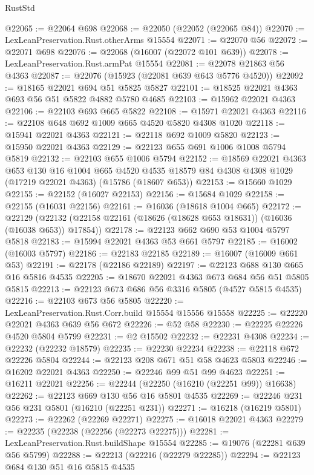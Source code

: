 \begin{lexlean}{RustStd}
\begin{coremodule}
@22065 := @22064 @698
@22068 := @22050 (@22052 (@22065 @84))
@22070 := LexLeanPreservation.Rust.otherArms @15554
@22071 := @22070 @56
@22072 := @22071 @698
@22076 := @22068 (@16007 (@22072 @101 @639))
@22078 := LexLeanPreservation.Rust.armPat @15554
@22081 := @22078 @21863 @56 @4363
@22087 := @22076 (@15923 (@22081 @639 @643 @5776 @4520))
@22092 := @18165 @22021 @694 @51 @5825 @5827
@22101 := @18525 @22021 @4363 @693 @56 @51 @5822 @4882 @5780 @4685
@22103 := @15962 @22021 @4363
@22106 := @22103 @693 @665 @5822
@22108 := @15971 @22021 @4363
@22116 := @22108 @648 @692 @1009 @665 @4520 @5820 @4308 @1020
@22118 := @15941 @22021 @4363
@22121 := @22118 @692 @1009 @5820
@22123 := @15950 @22021 @4363
@22129 := @22123 @655 @691 @1006 @1008 @5794 @5819
@22132 := @22103 @655 @1006 @5794
@22152 := @18569
    @22021
    @4363
    @653
    @130
    @16
    @1004
    @665
    @4520
    @4535
    @18579
    @84
    @4308
    @4308
    @1029
    (@17219 @22021 @4363)
    (@15786 (@18607 @653))
@22153 := @15660 @1029
@22155 := @22152 (@16027 @22153)
@22156 := @15684 @1029
@22158 := @22155 (@16031 @22156)
@22161 := @16036 (@18618 @1004 @665)
@22172 := @22129
    (@22132 (@22158 @22161 (@18626 (@18628 @653 @18631)) (@16036 (@16038 @653)) @17854))
@22178 := @22123 @662 @690 @53 @1004 @5797 @5818
@22183 := @15994 @22021 @4363 @53 @661 @5797
@22185 := @16002 (@16003 @5797)
@22186 := @22183 @22185
@22189 := @16007 (@16009 @661 @53)
@22191 := @22178 (@22186 @22189)
@22197 := @22123 @688 @130 @665 @16 @5816 @4535
@22205 := @18670 @22021 @4363 @673 @684 @56 @51 @5805 @5815
@22213 := @22123 @673 @686 @56 @3316 @5805 (@4527 @5815 @4535)
@22216 := @22103 @673 @56 @5805
@22220 := LexLeanPreservation.Rust.Corr.build @15554 @15556 @15558
@22225 := @22220 @22021 @4363 @639 @56 @672
@22226 := @52 @58
@22230 := @22225 @22226 @4520 @5804 @5799
@22231 := @2 @15502
@22232 := @22231 @4308
@22234 := @22232 (@22232 @18579)
@22235 := @22230 @22234
@22238 := @22118 @672 @22226 @5804
@22244 := @22123 @208 @671 @51 @58 @4623 @5803
@22246 := @16202 @22021 @4363
@22250 := @22246 @99 @51 @99 @4623
@22251 := @16211 @22021
@22256 := @22244 (@22250 (@16210 (@22251 @99)) @16638)
@22262 := @22123 @669 @130 @56 @16 @5801 @4535
@22269 := @22246 @231 @56 @231 @5801 (@16210 (@22251 @231))
@22271 := @16218 (@16219 @5801)
@22273 := @22262 (@22269 @22271)
@22275 := @16018 @22021 @4363
@22279 := @22235 (@22238 (@22256 (@22273 @22275)))
@22281 := LexLeanPreservation.Rust.buildShape @15554
@22285 := @19076 (@22281 @639 @56 @5799)
@22288 := @22213 (@22216 (@22279 @22285))
@22294 := @22123 @684 @130 @51 @16 @5815 @4535

\end{coremodule}
\end{lexlean}

